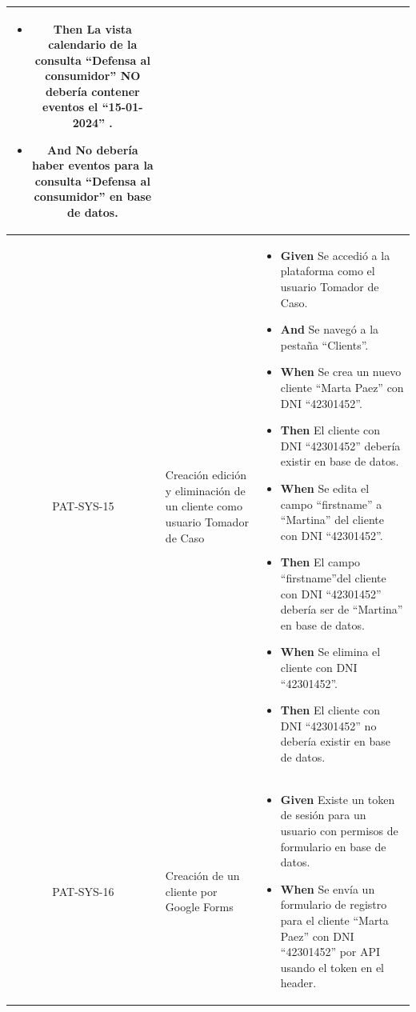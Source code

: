 \begin{longtable}{|c|p{2.5cm}|p{10.5cm}|}
\begin{itemize}
        \item \textbf{Then} La vista calendario de la consulta ``Defensa al consumidor'' NO debería contener eventos el ``15-01-2024'' .
        \item \textbf{And} No debería haber eventos para la consulta ``Defensa al consumidor'' en base de datos.

    \end{itemize}
    \\
    \hline
    PAT-SYS-15 & Creación edición y eliminación de un cliente como usuario Tomador de Caso & 
    \begin{itemize}
        \item \textbf{Given} Se accedió a la plataforma como el usuario Tomador de Caso.
        \item \textbf{And} Se navegó a la pestaña ``Clients''.
        \newline
        \item \textbf{When} Se crea un nuevo cliente ``Marta Paez'' con DNI ``42301452''.
        \newline
        \item \textbf{Then} El cliente con DNI ``42301452'' debería existir en base de datos.
        \newline
        \item \textbf{When} Se edita el campo ``firstname'' a ``Martina'' del cliente con DNI ``42301452''.
        \newline
        \item \textbf{Then} El campo ``firstname''del cliente con DNI ``42301452'' debería ser de ``Martina'' en base de datos.
        \newline
        \item \textbf{When} Se elimina el cliente con DNI ``42301452''.
        \newline
        \item \textbf{Then} El cliente con DNI ``42301452'' no debería existir en base de datos.
    \end{itemize}
    \\
    \hline
    PAT-SYS-16 & Creación de un cliente por Google Forms & 
    \begin{itemize}
        \item \textbf{Given} Existe un token de sesión para un usuario con permisos de formulario en base de datos.
        \newline
        \item \textbf{When} Se envía un formulario de registro para el cliente ``Marta Paez'' con DNI ``42301452'' por API usando el token en el header.

\end{itemize}
\end{longtable}
